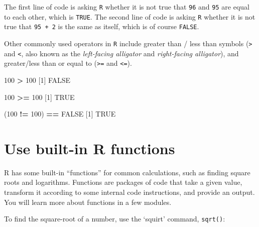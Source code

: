 \documentclass[
]{book}
\newenvironment{Shaded}{\begin{snugshade}}{\end{snugshade}}
\newcommand{\ConstantTok}[1]{\textcolor[rgb]{0.56,0.35,0.01}{#1}}
\newcommand{\DecValTok}[1]{\textcolor[rgb]{0.00,0.00,0.81}{#1}}
\newcommand{\NormalTok}[1]{#1}
\newcommand{\SpecialCharTok}[1]{\textcolor[rgb]{0.81,0.36,0.00}{\textbf{#1}}}
\begin{document}
The first line of code is asking \texttt{R} whether it is not true that \texttt{96} and \texttt{95} are equal to each other, which is \texttt{TRUE}. The second line of code is asking \texttt{R} whether it is not true that \texttt{95\ +\ 2} is the same as itself, which is of course \texttt{FALSE}.

Other commonly used operators in \texttt{R} include greater than / less than symbols (\texttt{\textgreater{}} and \texttt{\textless{}}, also known as the \emph{left-facing alligator} and \emph{right-facing alligator}), and greater/less than or equal to (\texttt{\textgreater{}=} and \texttt{\textless{}=}).

\begin{Shaded}
\begin{Highlighting}[]
\DecValTok{100} \SpecialCharTok{\textgreater{}} \DecValTok{100}
\NormalTok{[}\DecValTok{1}\NormalTok{] }\ConstantTok{FALSE}
\end{Highlighting}
\end{Shaded}

\begin{Shaded}
\begin{Highlighting}[]
\DecValTok{100} \SpecialCharTok{\textgreater{}=} \DecValTok{100}
\NormalTok{[}\DecValTok{1}\NormalTok{] }\ConstantTok{TRUE}
\end{Highlighting}
\end{Shaded}

\begin{Shaded}
\begin{Highlighting}[]
\NormalTok{(}\DecValTok{100} \SpecialCharTok{!=} \DecValTok{100}\NormalTok{) }\SpecialCharTok{==} \ConstantTok{FALSE}
\NormalTok{[}\DecValTok{1}\NormalTok{] }\ConstantTok{TRUE}
\end{Highlighting}
\end{Shaded}

\section*{Use built-in R functions}\label{use-built-in-r-functions}

R has some built-in ``functions'' for common calculations, such as finding square roots and logarithms. Functions are packages of code that take a given value, transform it according to some internal code instructions, and provide an output. You will learn more about functions in a few modules.

To find the square-root of a number, use the `squirt' command, \texttt{sqrt()}:
\end{document}
